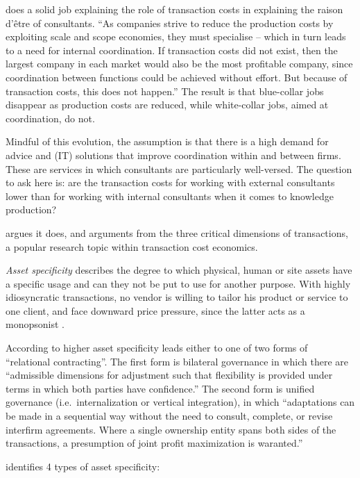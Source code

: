 \documentclass[12pt]{article}
\begin{document}
\citet[31]{canback1998} does a solid job explaining the role of
transaction costs in explaining the raison d'être of consultants. ``As
companies strive to reduce the production costs by exploiting scale and
scope economies, they must specialise -- which in turn leads to a need
for internal coordination. If transaction costs did not exist, then the
largest company in each market would also be the most profitable
company, since coordination between functions could be achieved without
effort. But because of transaction costs, this does not happen.'' The
result is that blue-collar jobs disappear as production costs are
reduced, while white-collar jobs, aimed at coordination, do not.

Mindful of this evolution, the assumption is that there is a high demand
for advice and (IT) solutions that improve coordination within and
between firms. These are services in which consultants are particularly
well-versed. The question to ask here is: are the transaction costs for
working with external consultants lower than for working with internal
consultants when it comes to knowledge production?

\citet[37-44]{canback1998} argues it does, and arguments from the three
critical dimensions of transactions, a popular research topic within
transaction cost economics.

\emph{Asset specificity} describes the degree to which physical, human
or site assets have a specific usage and can they not be put to use for
another purpose. With highly idiosyncratic transactions, no vendor is
willing to tailor his product or service to one client, and face
downward price pressure, since the latter acts as a monopsonist \citep[
218-228]{robinson1969}.

According to \citet[250-253]{williamson1979} higher asset specificity
leads either to one of two forms of ``relational contracting''. The
first form is bilateral governance in which there are ``admissible
dimensions for adjustment such that flexibility is provided under terms
in which both parties have confidence.'' The second form is unified
governance (i.e.~internalization or vertical integration), in which
``adaptations can be made in a sequential way without the need to
consult, complete, or revise interfirm agreements. Where a single
ownership entity spans both sides of the transactions, a presumption of
joint profit maximization is waranted.''

\citet[95-96]{williamson1985} identifies 4 types of asset specificity:
\end{document}
